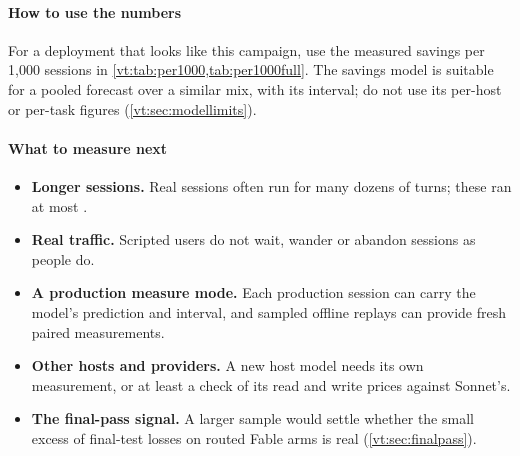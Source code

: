 \paragraph{How to use the numbers} For a deployment that looks like this campaign, use the measured savings per 1,000
sessions in \cref{vt:tab:per1000,tab:per1000full}. The savings model is suitable for a pooled forecast over a similar
mix, with its interval; do not use its per-host or per-task figures (\cref{vt:sec:modellimits}).

\paragraph{What to measure next}
\begin{itemize}[leftmargin=1.2em]
  \item \textbf{Longer sessions.} Real sessions often run for many dozens of turns; these ran at most \MaxTurns.
  \item \textbf{Real traffic.} Scripted users do not wait, wander or abandon sessions as people do.
  \item \textbf{A production measure mode.} Each production session can carry the model's prediction and interval, and
    sampled offline replays can provide fresh paired measurements.
  \item \textbf{Other hosts and providers.} A new host model needs its own measurement, or at least a check of its read
    and write prices against Sonnet's.
  \item \textbf{The final-pass signal.} A larger sample would settle whether the small excess of final-test losses on
    routed Fable arms is real (\cref{vt:sec:finalpass}).
\end{itemize}
